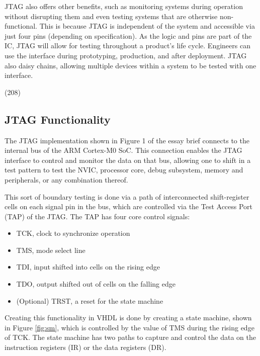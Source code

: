 \documentclass[11pt]{article}
\begin{document}
JTAG also offers other benefits, such as monitoring systems during operation without disrupting them and even testing systems that are otherwise non-functional\cite{Corelis}.
This is because JTAG is independent of the system and accessible via just four pins (depending on specification).
As the logic and pins are part of the IC, JTAG will allow for testing throughout a product's life cycle.
Engineers can use the interface during prototyping, production, and after deployment\cite{Corelis}.
JTAG also daisy chains, allowing multiple devices within a system to be tested with one interface.

(208)


\subsection{JTAG Functionality}
The JTAG implementation shown in Figure 1 of the essay brief connects to the internal bus of the ARM Cortex-M0 SoC.
This connection enables the JTAG interface to control and monitor the data on that bus, allowing one to shift in a test pattern to test
the NVIC, processor core, debug subsystem, memory and peripherals, or any combination thereof. 

This sort of boundary testing is done via a path of interconnected shift-register cells on each signal pin in the bus, which are controlled via the Test Access Port (TAP) of the JTAG.
The TAP has four core control signals\cite{JTAG}:
\begin{itemize}
    \item TCK, clock to synchronize operation
    \item TMS, mode select line
    \item TDI, input shifted into cells on the rising edge
    \item TDO, output shifted out of cells on the falling edge 
    \item (Optional) TRST, a reset for the state machine 
\end{itemize}

Creating this functionality in VHDL is done by creating a state machine, shown in Figure \ref{fig:sm}, which is controlled by the value of TMS during the rising edge of TCK.
The state machine has two paths to capture and control the data on the instruction registers (IR) or the data registers (DR).
\end{document}
